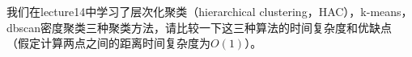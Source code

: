 \begin{solution}
    
\end{solution}

\begin{problem}
    我们在lecture14中学习了层次化聚类（hierarchical clustering，HAC），k-means，dbscan密度聚类三种聚类方法，请比较一下这三种算法的时间复杂度和优缺点（假定计算两点之间的距离时间复杂度为$O(1)$）。
\end{problem}

\begin{solution}
    
\end{solution}

